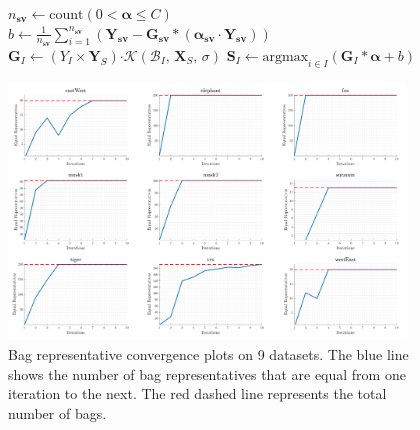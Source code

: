 \documentclass[reqno]{vcuthesis}
\newcommand{\set}[1]{{\left\{#1\right\}}}
\newcommand\tab[1][1cm]{\hspace*{#1}}
\numberwithin{equation}{chapter}
\begin{document}
\begin{figure}[t!]
\begin{minipage}{\textwidth}
\begin{algorithm}[H]
\begin{algorithmic}
\State $n_{\bm{sv}} \leftarrow \text{count}\left(0 < \bm \alpha \leq C \right)$ 
\State $b \leftarrow \frac{1}{n_{\bm{sv}}}\sum_{i=1}^{n_{\bm{sv}}} \left(\bm Y_{\bm{sv}} - \bm G_{\bm{sv}}*\left(\bm{\alpha_{\bm{sv}}} \cdot \bm Y_{\bm{sv}}\right)\right)$ 
\For {$I \in \set{1,\ldots,n}$} 
\State $\bm G_I \leftarrow (Y_I \times \bm Y_S) \bm \cdot \mathcal{K}\left( \mathcal{B}_I,\,\bm X_S,\,\sigma\right)$
\State $\bm S_I \leftarrow \text{argmax}_{i \in I}\left(\bm G_I*\bm{\alpha} + b \right)$ \tab\tab[0.62cm]
\EndFor
\EndWhile 
\end{algorithmic}
\end{algorithm}
\end{minipage}
\end{figure}
\newpage
\begin{figure}[t!]
\centering
\includegraphics[width=0.94\textwidth]{figures/convergence.png} 
\caption{Bag representative convergence plots on 9 datasets. The blue line shows the number of bag representatives that are equal from one iteration to the next. The red dashed line represents the total number of bags.}\label{fig:convegence}
\end{figure}
\end{document}
